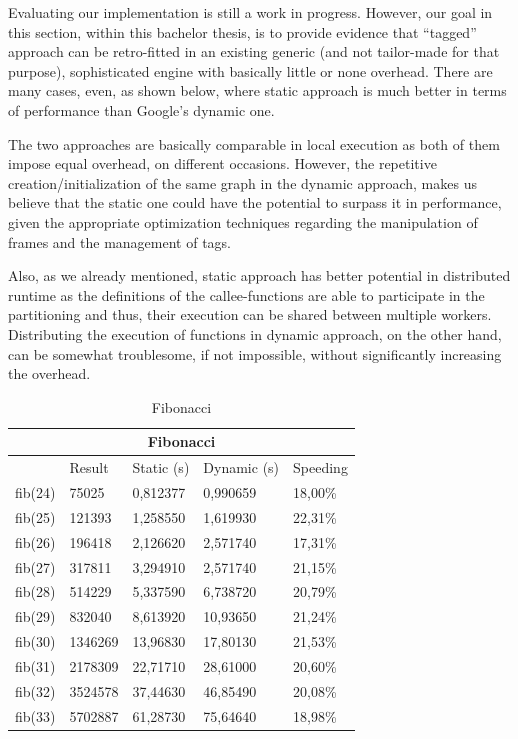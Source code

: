 \documentclass[ack,preface]{dithesis}
\begin{document}
Evaluating our implementation is still a work in progress. However, our goal in this section, within this bachelor thesis, is to provide evidence that “tagged” approach can be retro-fitted in an existing generic (and not tailor-made for that purpose), sophisticated engine with basically  little or  none overhead. There are  many cases, even, as shown below, where static approach is much better in terms of performance than  Google's dynamic one.

The two approaches are basically comparable in local execution as both of them impose equal overhead, on different occasions.
However, the repetitive creation/initialization of the same graph in the dynamic approach, makes us believe that the static one could have the potential to surpass it in performance, given the appropriate optimization techniques regarding the manipulation of frames and the management of tags. 

Also, as we already mentioned, static approach has better potential in distributed runtime as the definitions of the callee-functions are able to participate in the partitioning and thus, their execution can be shared between multiple workers. Distributing the execution of functions in dynamic approach, on the other hand, can be somewhat troublesome, if not impossible, without significantly increasing the overhead.


\begin{table}[h!]
\centering

\begin{tabular}{ |p{3cm}||p{2cm}|p{3cm}|p{3cm}||p{2cm}|  }

 \hline
 \multicolumn{5}{|c|}{Fibonacci} \\
 \hline
 	& Result &Static (s)&Dynamic (s)&Speeding\\
 \hline
 fib(24) & 75025      &0,812377    &   0,990659 &   18,00\%\\
 fib(25) & 121393    &1,258550    &1,619930    &   22,31\%\\
 fib(26) & 196418    & 2,126620   &  2,571740  &   17,31\%\\
 fib(27) & 317811    & 3,294910   &  2,571740  &   21,15\%\\
 fib(28) & 514229    & 5,337590   &6,738720    &   20,79\%\\
 fib(29) & 832040    & 8,613920   &10,93650   &   21,24\%\\
 fib(30) & 1346269  & 13,96830 &17,80130  &   21,53\%\\
 fib(31) & 2178309  & 22,71710 &28,61000  &   20,60\%\\
 fib(32) & 3524578  & 37,44630 &46,85490  &   20,08\%\\
 fib(33) & 5702887  & 61,28730 &75,64640  &   18,98\%\\
 \hline
\end{tabular}
\caption{Fibonacci}
\label{table:1}
\end{table}
\end{document}
